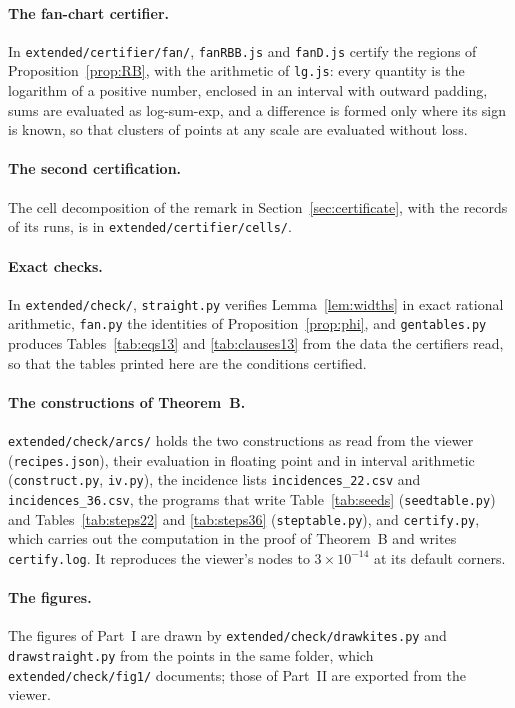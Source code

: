 \documentclass[11pt,a4paper]{article}
\theoremstyle{definition}
\theoremstyle{remark}
\begin{document}
\begin{sloppypar}
\paragraph{The fan-chart certifier.} In \texttt{extended/certifier/fan/}, \texttt{fanRBB.js} and
\texttt{fanD.js} certify the regions of
Proposition~\ref{prop:RB}, with the arithmetic of \texttt{lg.js}: every quantity is the logarithm of a
positive number, enclosed in an interval with outward padding, sums are evaluated as log-sum-exp, and a
difference is formed only where its sign is known, so that clusters of points at any scale are evaluated
without loss.

\paragraph{The second certification.} The cell decomposition of the remark in
Section~\ref{sec:certificate}, with the records of its runs, is in \texttt{extended/certifier/cells/}.

\paragraph{Exact checks.} In \texttt{extended/check/}, \texttt{straight.py} verifies
Lemma~\ref{lem:widths} in exact rational arithmetic, \texttt{fan.py} the identities of
Proposition~\ref{prop:phi}, and \texttt{gentables.py} produces Tables~\ref{tab:eqs13} and \ref{tab:clauses13} from the data the
certifiers read, so that the tables printed here are the conditions certified.

\paragraph{The constructions of Theorem~B.} \texttt{extended/check/arcs/} holds the two constructions as
read from the viewer (\texttt{recipes.json}), their evaluation in floating point and in interval
arithmetic (\texttt{construct.py}, \texttt{iv.py}), the incidence lists \texttt{incidences\_22.csv} and
\texttt{incidences\_36.csv}, the programs that write Table~\ref{tab:seeds} (\texttt{seedtable.py}) and
Tables~\ref{tab:steps22} and \ref{tab:steps36} (\texttt{steptable.py}), and \texttt{certify.py}, which carries out the computation in the proof of
Theorem~B and writes \texttt{certify.log}. It reproduces the viewer's nodes to $3\times10^{-14}$ at its
default corners.

\paragraph{The figures.} The figures of Part~I are drawn by \texttt{extended/check/drawkites.py} and
\texttt{drawstraight.py} from the points in the same folder, which \texttt{extended/check/fig1/} documents;
those of Part~II are exported from the viewer.

\end{sloppypar}
\end{document}
